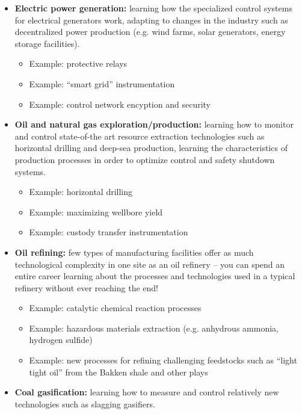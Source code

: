 \begin{itemize}
\item{} {\bf Electric power generation:} learning how the specialized control systems for electrical generators work, adapting to changes in the industry such as decentralized power production (e.g. wind farms, solar generators, energy storage facilities).
\begin{itemize}

\item{} Example: protective relays
\item{} Example: ``smart grid'' instrumentation
\item{} Example: control network encyption and security
\end{itemize}
\item{} {\bf Oil and natural gas exploration/production:} learning how to monitor and control state-of-the art resource extraction technologies such as horizontal drilling and deep-sea production, learning the characteristics of production processes in order to optimize control and safety shutdown systems.
\begin{itemize}

\item{} Example: horizontal drilling
\item{} Example: maximizing wellbore yield
\item{} Example: custody transfer instrumentation
\end{itemize}
\item{} {\bf Oil refining:} few types of manufacturing facilities offer as much technological complexity in one site as an oil refinery -- you can spend an entire career learning about the processes and technologies used in a typical refinery without ever reaching the end!
\begin{itemize}

\item{} Example: catalytic chemical reaction processes
\item{} Example: hazardous materials extraction (e.g. anhydrous ammonia, hydrogen sulfide)
\item{} Example: new processes for refining challenging feedstocks such as ``light tight oil'' from the Bakken shale and other plays
\end{itemize}
\item{} {\bf Coal gasification:} learning how to measure and control relatively new technologies such as slagging gasifiers.
\begin{itemize}


\end{itemize}
\end{itemize}
